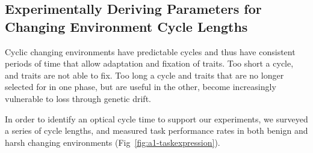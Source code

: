 \documentclass[PhD]{msu-thesis}
\begin{document}
\begin{appendices}
\chapter{Experimentally Deriving Parameters for Changing Environment Cycle Lengths}
\label{appendix:ce_sweep}
Cyclic changing environments have predictable cycles and thus have consistent periods of time that allow adaptation and fixation of traits. Too short a cycle, and traits are not able to fix. Too long a cycle and traits that are no longer selected for in one phase, but are useful in the other, become increasingly vulnerable to loss through genetic drift.

In order to identify an optical cycle time to support our experiments, we surveyed a series of cycle lengths, and measured task performance rates in both benign and harsh changing environments (Fig~\ref{fig:a1-taskexpression}).

	\begin{figure}[!h]


\end{figure}
\end{appendices}
\end{document}
